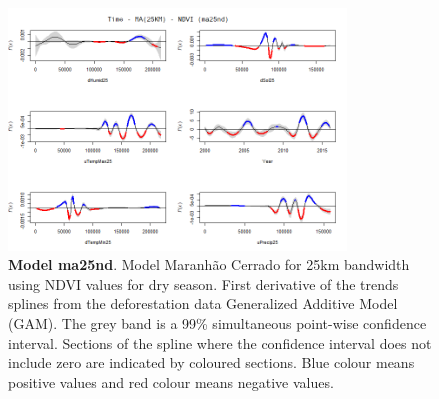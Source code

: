 \begin{table}

\begin{figure}[H]
 \centering
        \centering
        \includegraphics[width=0.8\textwidth]{ma25nd.png} %
        \caption[Model Cerrado Maranhão for 25km bandwidth using NDVI values for dry season. First derivative of the trends splines from the deforestation data Generalized Additive Model (GAM)]{\textbf{Model ma25nd}. Model Maranhão Cerrado for 25km bandwidth using NDVI values for dry season. First derivative of the trends splines from the deforestation data Generalized Additive Model (GAM). The grey band is a 99\% simultaneous point-wise confidence interval. Sections of the spline where the confidence interval does not include zero are indicated by coloured sections. Blue colour means positive values and red colour means negative values.}
\end{figure}
\end{table}

